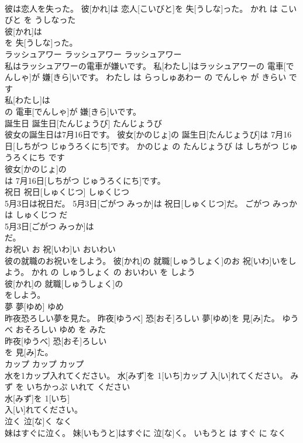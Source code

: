 \documentclass[8pt]{extreport}
\begin{document}
\begin{CJK}{UTF8}{min}
\\	彼は恋人を失った。	彼[かれ]は 恋人[こいびと]を 失[うしな]った。	かれ は こいびと を うしなった	
\\	彼[かれ]は
\\	を 失[うしな]った。			
\\	ラッシュアワー	ラッシュアワー	ラッシュアワー	
\\	私はラッシュアワーの電車が嫌いです。	私[わたし]はラッシュアワーの 電車[でんしゃ]が 嫌[きら]いです。	わたし は らっしゅあわー の でんしゃ が きらい です	
\\	私[わたし]は
\\	の 電車[でんしゃ]が 嫌[きら]いです。			
\\	誕生日	誕生日[たんじょうび]	たんじょうび	
\\	彼女の誕生日は7月16日です。	彼女[かのじょ]の 誕生日[たんじょうび]は 7月16日[しちがつ じゅうろくにち]です。	かのじょ の たんじょうび は しちがつ じゅうろくにち です	
\\	彼女[かのじょ]の
\\	は 7月16日[しちがつ じゅうろくにち]です。			
\\	祝日	祝日[しゅくじつ]	しゅくじつ	
\\	5月3日は祝日だ。	5月3日[ごがつ みっか]は 祝日[しゅくじつ]だ。	ごがつ みっか は しゅくじつ だ	
\\	5月3日[ごがつ みっか]は
\\	だ。			
\\	お祝い	お 祝[いわ]い	おいわい	
\\	彼の就職のお祝いをしよう。	彼[かれ]の 就職[しゅうしょく]のお 祝[いわ]いをしよう。	かれ の しゅうしょく の おいわい を しよう	
\\	彼[かれ]の 就職[しゅうしょく]の
\\	をしよう。			
\\	夢	夢[ゆめ]	ゆめ	
\\	昨夜恐ろしい夢を見た。	昨夜[ゆうべ] 恐[おそ]ろしい 夢[ゆめ]を 見[み]た。	ゆうべ おそろしい ゆめ を みた	
\\	昨夜[ゆうべ] 恐[おそ]ろしい
\\	を 見[み]た。			
\\	カップ	カップ	カップ	
\\	水を1カップ入れてください。	水[みず]を 1[いち]カップ 入[い]れてください。	みず を いちかっぷ いれて ください	
\\	水[みず]を 1[いち]
\\	入[い]れてください。			
\\	泣く	泣[な]く	なく	
\\	妹はすぐに泣く。	妹[いもうと]はすぐに 泣[な]く。	いもうと は すぐ に なく	

\end{CJK}
\end{document}
